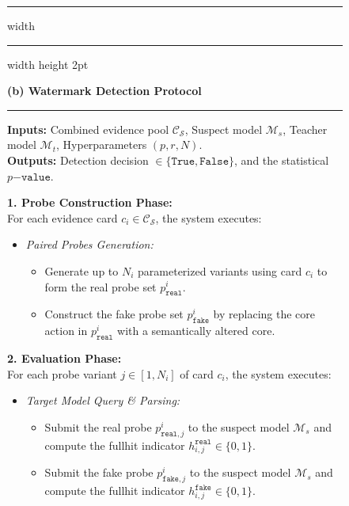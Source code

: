 \begin{figure}[!t]
\hrule width \hsize \kern 1mm \hrule width \hsize height 2pt

\textbf{(b) \name{} Watermark Detection Protocol}

\hrule

\textbf{Inputs:} Combined evidence pool $\mathcal{C}_{\mathcal{S}}$, Suspect model $\mathcal{M}_s$, Teacher model $\mathcal{M}_t$, Hyperparameters $(p, r, N)$. \\
\textbf{Outputs:} Detection decision $\in \{\mathtt{True}, \mathtt{False}\}$, and the statistical $p\mathtt{-value}$.


\noindent \textbf{1. Probe Construction Phase:} \\
For each evidence card $c_i \in \mathcal{C}_{\mathcal{S}}$, the system executes:
\begin{itemize}
    \item \textit{Paired Probes Generation:}
\begin{itemize}
        \item Generate up to $N_i$ parameterized variants using card $c_i$ to form the real probe set $p_{\mathtt{real}}^i$.
        \item Construct the fake probe set $p_{\mathtt{fake}}^i$ by replacing the core action in $p_{\mathtt{real}}^i$ with a semantically altered core.
    \end{itemize}
\end{itemize}

\noindent \textbf{2. Evaluation Phase:} \\
For each probe variant $j \in [1, N_i]$ of card $c_i$, the system executes:
\begin{itemize}
    \item \textit{Target Model Query \& Parsing:}
\begin{itemize}
        \item Submit the real probe $p_{\mathtt{real}, j}^i$ to the suspect model $\mathcal{M}_s$ and compute the fullhit indicator $h_{i,j}^{\mathtt{real}} \in \{0, 1\}$.
        \item Submit the fake probe $p_{\mathtt{fake}, j}^i$ to the suspect model $\mathcal{M}_s$ and compute the fullhit indicator $h_{i,j}^{\mathtt{fake}} \in \{0, 1\}$.
    \end{itemize}
\end{itemize}


\end{figure}
